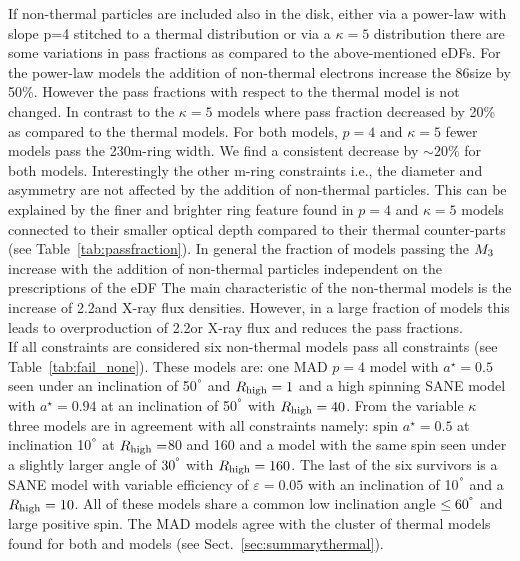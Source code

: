 If non-thermal particles are included also in the disk, either via a power-law with slope p=4 stitched to a thermal distribution or via a $\kappa=5$ distribution there are some variations in pass fractions as compared to the above-mentioned eDFs.
\newline For the power-law models the addition of non-thermal electrons increase the 86\GHz size by 50\%. However the pass fractions with respect to the thermal model is not changed. In contrast to the $\kappa=5$ models where pass fraction decreased by 20\% as compared to the thermal models.
\newline For both models, $p=4$ and $\kappa=5$ fewer models pass the 230\GHz m-ring width. We find a consistent decrease by $\sim20\%$ for both models. Interestingly the other m-ring constraints i.e., the diameter and asymmetry are not affected by the addition of non-thermal particles. This can be explained by the finer and brighter ring feature found in $p=4$ and $\kappa=5$ models connected to their smaller optical depth compared to their thermal counter-parts (see Table~\ref{tab:passfraction}). 
\newline In general the fraction of models passing the $M_{3}$ increase with the addition of non-thermal particles independent on the prescriptions of the eDF %
\newline The main characteristic of the non-thermal models is the increase of 2.2\um and X-ray flux densities. However, in a large fraction of models this leads to overproduction of 2.2\um or X-ray flux and reduces the pass fractions.\\


If all constraints are considered six non-thermal models pass all constraints (see Table~\ref{tab:fail_none}). These models are: one \hamr MAD $p=4$ model with $a^\star=0.5$ seen under an inclination of 50$^\degree$ and  $R_{\rm high}=1$ and a high spinning SANE model with $a^\star=0.94$ at an inclination of 50$^\degree$ with $R_{\rm high}=40$. From the \bhac variable $\kappa$ three models are in agreement with all constraints namely: spin $a^\star=0.5$ at inclination 10$^\degree$ at $R_{\rm high}=$80 and 160 and a model with the same spin seen under a slightly larger angle of $30^\degree$ with $R_{\rm high}=160$. The last of the six survivors is a \bhac SANE model with variable efficiency of  $\varepsilon=0.05$ with an inclination of 10$^\degree$ and a $R_{\rm high}=10$. All of these models share a common low inclination angle $\leq 60^\degree$ and large positive spin. The MAD models agree with the cluster of thermal models found for both \bhac and \kharma models (see Sect.~\ref{sec:summarythermal}).

